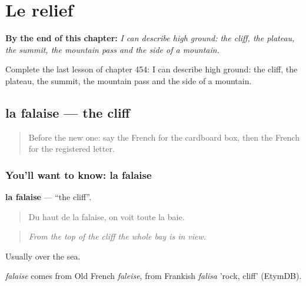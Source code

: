 
\chapter{Le relief}
\label{ch:fr-le-relief}

\begin{chapteropening}
\textbf{By the end of this chapter:} \emph{I can describe high ground: the cliff, the plateau, the summit, the mountain pass and the side of a mountain.}

Complete the last lesson of chapter 454: I can describe high ground: the cliff, the plateau, the summit, the mountain pass and the side of a mountain.
\end{chapteropening}

\section[la falaise]{la falaise — the cliff}

\label{lesson:FR-C454-falaise}



\begin{quote}
Before the new one: say the French for the cardboard box, then the French for the registered letter.
\end{quote}

\subsection*{You'll want to know: la falaise}
\textbf{la falaise} — \textquotedblleft{}the cliff\textquotedblright{}.

\begin{quote}
Du haut de la falaise, on voit toute la baie.
\end{quote}

\begin{quote}
\emph{From the top of the cliff the whole bay is in view.}
\end{quote}

Usually over the sea.

\begin{cousinweb}
\emph{falaise} comes from Old French \emph{faleise}, from Frankish \emph{falisa} 'rock, cliff' (EtymDB).
\end{cousinweb}


